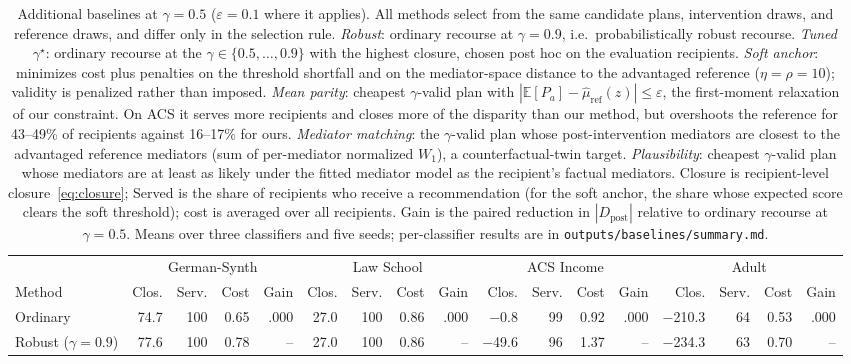 \begin{table}[t]
\centering
\footnotesize
\caption{Additional baselines at $\gamma=0.5$ ($\varepsilon=0.1$ where it
applies). All methods select from the same candidate plans, intervention
draws, and reference draws, and differ only in the selection rule.
\emph{Robust}: ordinary recourse at $\gamma=0.9$, i.e.\ probabilistically
robust recourse. \emph{Tuned $\gamma^\star$}: ordinary recourse at the
$\gamma\in\{0.5,\ldots,0.9\}$ with the highest closure, chosen post hoc on the
evaluation recipients. \emph{Soft anchor}: minimizes cost plus penalties on
the threshold shortfall and on the mediator-space distance to the advantaged
reference ($\eta=\rho=10$); validity is penalized rather than imposed.
\emph{Mean parity}: cheapest $\gamma$-valid plan with
$|\mathbb E[P_a]-\hat\mu_{\mathrm{ref}}(z)|\le\varepsilon$, the first-moment
relaxation of our constraint. On ACS it serves more recipients and closes more
of the disparity than our method, but overshoots the reference for 43--49\% of
recipients against 16--17\% for ours. \emph{Mediator matching}: the $\gamma$-valid plan
whose post-intervention mediators are closest to the advantaged reference
mediators (sum of per-mediator normalized $W_1$), a counterfactual-twin
target. \emph{Plausibility}: cheapest $\gamma$-valid plan whose mediators are
at least as likely under the fitted mediator model as the recipient's factual
mediators. Closure is recipient-level closure~\eqref{eq:closure}; Served is
the share of recipients who receive a recommendation (for the soft anchor, the
share whose expected score clears the soft threshold); cost is averaged over
all recipients. Gain is the paired reduction in $|D_{\mathrm{post}}|$ relative
to ordinary recourse at $\gamma=0.5$. Means over three classifiers and five
seeds; per-classifier results are in \texttt{outputs/baselines/summary.md}.}
\label{tab:app_baselines}
\setlength{\tabcolsep}{2.5pt}
\begin{tabular}{lrrrrrrrrrrrrrrrr}
\hline
& \multicolumn{4}{c}{German-Synth} & \multicolumn{4}{c}{Law School} & \multicolumn{4}{c}{ACS Income} & \multicolumn{4}{c}{Adult} \\
\cline{2-5} \cline{6-9} \cline{10-13} \cline{14-17}
Method & Clos. & Serv. & Cost & Gain & Clos. & Serv. & Cost & Gain & Clos. & Serv. & Cost & Gain & Clos. & Serv. & Cost & Gain \\
\hline
Ordinary & 74.7 & 100 & 0.65 & .000 & 27.0 & 100 & 0.86 & .000 & $-$0.8 & 99 & 0.92 & .000 & $-$210.3 & 64 & 0.53 & .000 \\
Robust ($\gamma=0.9$) & 77.6 & 100 & 0.78 & -- & 27.0 & 100 & 0.86 & -- & $-$49.6 & 96 & 1.37 & -- & $-$234.3 & 63 & 0.70 & -- \\

\end{tabular}
\end{table}
